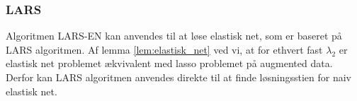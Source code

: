\subsubsection{LARS}
Algoritmen LARS-EN kan anvendes til at løse elastisk net, som er baseret på LARS algoritmen.
Af lemma \ref{lem:elastisk_net} ved vi, at for ethvert fast \(\lambda_2\) er elastisk net problemet ækvivalent med lasso problemet på augmented data.
Derfor kan LARS algoritmen anvendes direkte til at finde løsningsstien for naiv elastisk net.

%
%
%
%
